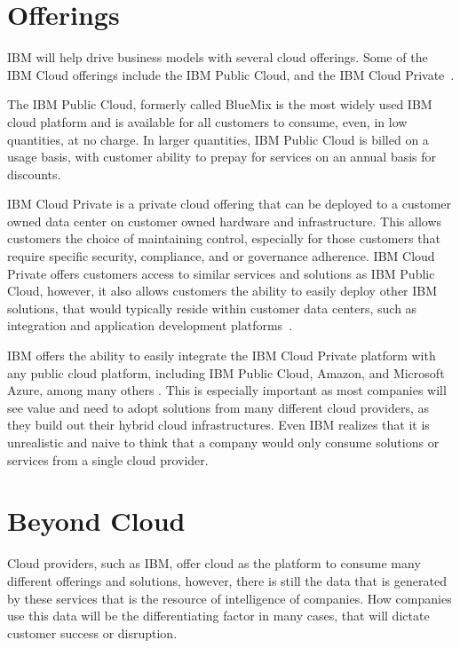 \section{Offerings}

IBM will help drive business models with several cloud offerings. Some
of the IBM Cloud offerings include the IBM Public Cloud, and the IBM
Cloud Private~\cite{hid-sp18-525-winning}.

The IBM Public Cloud, formerly called BlueMix is the most widely used
IBM cloud platform and is available for all customers to consume,
even, in low quantities, at no charge. In larger quantities, IBM
Public Cloud is billed on a usage basis, with customer ability to
prepay for services on an annual basis for discounts.

IBM Cloud Private is a private cloud offering that can be deployed to
a customer owned data center on customer owned hardware and
infrastructure. This allows customers the choice of maintaining
control, especially for those customers that require specific
security, compliance, and or governance adherence. IBM Cloud Private
offers customers access to similar services and solutions as IBM
Public Cloud, however, it also allows customers the ability to easily
deploy other IBM solutions, that would typically reside within
customer data centers, such as integration and application development
platforms~\cite{hid-sp18-525-winning}.

IBM offers the ability to easily integrate the IBM Cloud Private
platform with any public cloud platform, including IBM Public Cloud,
Amazon, and Microsoft Azure, among many others
\cite{hid-sp18-525-winning}. This is especially important as most
companies will see value and need to adopt solutions from many
different cloud providers, as they build out their hybrid cloud
infrastructures. Even IBM realizes that it is unrealistic and naive to
think that a company would only consume solutions or services from a
single cloud provider.

\section{Beyond Cloud}

Cloud providers, such as IBM, offer cloud as the platform to consume
many different offerings and solutions, however, there is still the
data that is generated by these services that is the resource of
intelligence of companies. How companies use this data will be the
differentiating factor in many cases, that will dictate customer
success or disruption.


